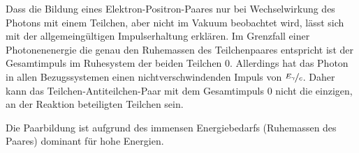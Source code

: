 Dass die Bildung eines Elektron-Positron-Paares nur bei Wechselwirkung des Photons mit einem Teilchen, aber nicht im Vakuum beobachtet wird, lässt sich mit der allgemeingültigen Impulserhaltung erklären.
Im Grenzfall einer Photonenenergie die genau den Ruhemassen des Teilchenpaares entspricht ist der Gesamtimpuls im Ruhesystem der beiden Teilchen 0.
Allerdings hat das Photon in allen Bezugssystemen einen nichtverschwindenden Impuls von $\nicefrac{E_\gamma}{c}$.
Daher kann das Teilchen-Antiteilchen-Paar mit dem Gesamtimpuls 0 nicht die einzigen, an der Reaktion beteiligten Teilchen sein.

Die Paarbildung ist aufgrund des immensen Energiebedarfs (Ruhemassen des Paares) dominant für hohe Energien.
